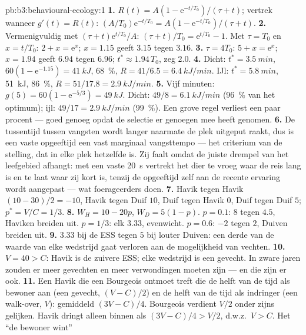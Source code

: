 \begin{solution}{pb:b3:behavioural-ecology:1}
\textbf{1.} $R(t) = A(1 - \mathrm{e}^{-t/T_{0}})/(\tau + t)$; vertrek
wanneer $g'(t) = R(t)$: $(A/T_{0})\mathrm{e}^{-t/T_{0}} = A(1 - \mathrm{e}^{-t/T_{0}})/
(\tau + t)$.
\textbf{2.} Vermenigvuldig met $(\tau + t)\mathrm{e}^{t/T_{0}}/A$: $(\tau + t)/T_{0}
= \mathrm{e}^{t/T_{0}} - 1$. Met $\tau = T_{0}$ en $x = t/T_{0}$: $2 + x =
\mathrm{e}^{x}$; $x = 1.15$ geeft $3.15$ tegen $3.16$.
\textbf{3.} $\tau = 4T_{0}$: $5 + x = \mathrm{e}^{x}$; $x = 1.94$ geeft
$6.94$ tegen $6.96$; $t^{*} \approx 1.94\,T_{0}$, zeg $2.0$.
\textbf{4.} Dicht: $t^{*} = \qty{3.5}{min}$, $60(1 - \mathrm{e}^{-1.15}) =
\qty{41}{kJ}$, \qty{68}{\%}, $R = 41/6.5 = \qty{6.4}{kJ/min}$. IJl:
$t^{*} = \qty{5.8}{min}$, \qty{51}{kJ}, \qty{86}{\%}, $R = 51/17.8 =
\qty{2.9}{kJ/min}$.
\textbf{5.} Vijf minuten: $g(5) = 60(1 - \mathrm{e}^{-5/3}) = \qty{49}{kJ}$.
Dicht: $49/8 = \qty{6.1}{kJ/min}$ (\qty{96}{\%} van het optimum); ijl:
$49/17 = \qty{2.9}{kJ/min}$ (\qty{99}{\%}). Een grove regel verliest een
paar procent --- goed genoeg opdat de selectie er genoegen mee heeft
genomen.
\textbf{6.} De tussentijd tussen vangsten wordt langer naarmate de plek
uitgeput raakt, dus is een vaste opgeeftijd een vast marginaal
vangsttempo --- het criterium van de stelling, dat in elke plek
hetzelfde is. Zij faalt omdat de juiste drempel van het leefgebied
afhangt: met een vaste \qty{20}{s} vertrekt het dier te vroeg waar de
reis lang is en te laat waar zij kort is, tenzij de opgeeftijd zelf aan
de recente ervaring wordt aangepast --- wat foerageerders doen.
\textbf{7.} Havik tegen Havik $(10 - 30)/2 = -10$, Havik tegen Duif
$10$, Duif tegen Havik $0$, Duif tegen Duif $5$; $p^{*} = V/C = 1/3$.
\textbf{8.} $W_{H} = 10 - 20p$, $W_{D} = 5(1 - p)$. $p = 0.1$: $8$ tegen
$4.5$, Haviken breiden uit. $p = 1/3$: elk $3.33$, evenwicht. $p = 0.6$:
$-2$ tegen $2$, Duiven breiden uit.
\textbf{9.} $3.33$ bij de ESS tegen $5$ bij louter Duiven: een derde van
de waarde van elke wedstrijd gaat verloren aan de mogelijkheid van
vechten.
\textbf{10.} $V = 40 > C$: Havik is de zuivere ESS; elke wedstrijd is
een gevecht. In zware jaren zouden er meer gevechten en meer
verwondingen moeten zijn --- en die zijn er ook.
\textbf{11.} Een Havik die een Bourgeois ontmoet treft die de helft van
de tijd als bewoner aan (een gevecht, $(V - C)/2$) en de helft van de
tijd als indringer (een walk-over, $V$): gemiddeld $(3V - C)/4$.
Bourgeois verdient $V/2$ onder zijns gelijken. Havik dringt alleen
binnen als $(3V - C)/4 > V/2$, d.w.z.\ $V > C$. Het ``de bewoner wint''

\end{solution}
